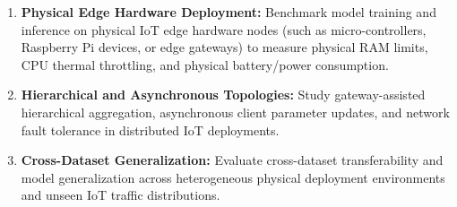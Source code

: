 \documentclass[11pt,a4paper]{article}
\begin{document}
\begin{enumerate}
    \item \textbf{Physical Edge Hardware Deployment:} Benchmark model training and inference on physical IoT edge hardware nodes (such as micro-controllers, Raspberry Pi devices, or edge gateways) to measure physical RAM limits, CPU thermal throttling, and physical battery/power consumption.
    \item \textbf{Hierarchical and Asynchronous Topologies:} Study gateway-assisted hierarchical aggregation, asynchronous client parameter updates, and network fault tolerance in distributed IoT deployments.
    \item \textbf{Cross-Dataset Generalization:} Evaluate cross-dataset transferability and model generalization across heterogeneous physical deployment environments and unseen IoT traffic distributions.
\end{enumerate}
\end{document}
